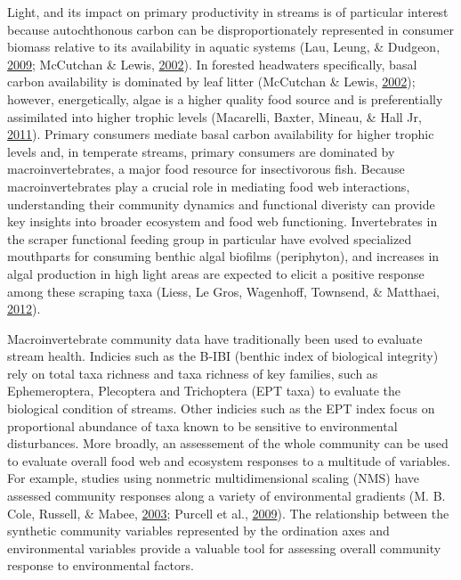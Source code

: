 \documentclass[double,12pt]{beavtex}
\begin{document}
  Light, and its impact on primary productivity in streams is of
  particular interest because autochthonous carbon can be
  disproportionately represented in consumer biomass relative to its
  availability in aquatic systems (Lau, Leung, \& Dudgeon,
  \protect\hyperlink{ref-Lau2009}{2009}; McCutchan \& Lewis,
  \protect\hyperlink{ref-McCutchan2002}{2002}). In forested headwaters
  specifically, basal carbon availability is dominated by leaf litter
  (McCutchan \& Lewis, \protect\hyperlink{ref-McCutchan2002}{2002});
  however, energetically, algae is a higher quality food source and is
  preferentially assimilated into higher trophic levels (Macarelli,
  Baxter, Mineau, \& Hall Jr,
  \protect\hyperlink{ref-Macarelli2011}{2011}). Primary consumers mediate
  basal carbon availability for higher trophic levels and, in temperate
  streams, primary consumers are dominated by macroinvertebrates, a major
  food resource for insectivorous fish. Because macroinvertebrates play a
  crucial role in mediating food web interactions, understanding their
  community dynamics and functional diveristy can provide key insights
  into broader ecosystem and food web functioning. Invertebrates in the
  scraper functional feeding group in particular have evolved specialized
  mouthparts for consuming benthic algal biofilms (periphyton), and
  increases in algal production in high light areas are expected to elicit
  a positive response among these scraping taxa (Liess, Le Gros,
  Wagenhoff, Townsend, \& Matthaei,
  \protect\hyperlink{ref-liess2012}{2012}).
  
  Macroinvertebrate community data have traditionally been used to
  evaluate stream health. Indicies such as the B-IBI (benthic index of
  biological integrity) rely on total taxa richness and taxa richness of
  key families, such as Ephemeroptera, Plecoptera and Trichoptera (EPT
  taxa) to evaluate the biological condition of streams. Other indicies
  such as the EPT index focus on proportional abundance of taxa known to
  be sensitive to environmental disturbances. More broadly, an assessement
  of the whole community can be used to evaluate overall food web and
  ecosystem responses to a multitude of variables. For example, studies
  using nonmetric multidimensional scaling (NMS) have assessed community
  responses along a variety of environmental gradients (M. B. Cole,
  Russell, \& Mabee, \protect\hyperlink{ref-Cole2003}{2003}; Purcell et
  al., \protect\hyperlink{ref-Purcell2009}{2009}). The relationship
  between the synthetic community variables represented by the ordination
  axes and environmental variables provide a valuable tool for assessing
  overall community response to environmental factors.
  
\end{document}
